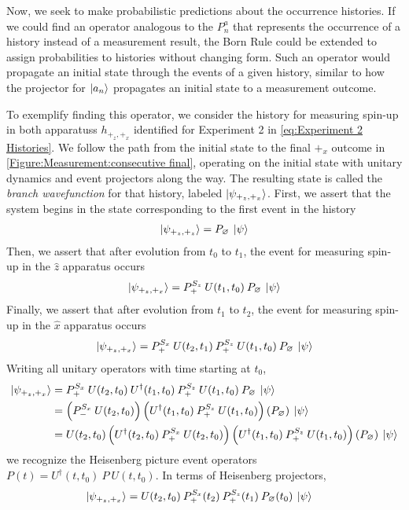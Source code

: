 Now, we seek to make probabilistic predictions about the occurrence histories. If we could find an operator analogous to the $P^a_n$ that represents the occurrence of a history instead of a measurement result, the Born Rule could be extended to assign probabilities to histories without changing form. Such an operator would propagate an initial state through the events of a given history, similar to how the projector for $\ket{a_n}$ propagates an initial state to a measurement outcome.

To exemplify finding this operator, we consider the history for measuring spin-up in both apparatuss $h_{+_z, +_x}$ identified for Experiment 2 in \autoref{eq:Experiment 2 Histories}. We follow the path from the initial state to the final $+_x$ outcome in \autoref{Figure:Measurement:consecutive final}, operating on the initial state with unitary dynamics and event projectors along the way. The resulting state is called the \textit{branch wavefunction} for that history, labeled $\ket{\psi_{+_z, +_x}}$.  First, we assert that the system begins in the state corresponding to the first event in the history
\begin{align}
  \ket{\psi_{+_z, +_z}} = P_\varnothing \: \ket{\psi}
\end{align}
Then, we assert that after evolution from $t_0$ to $t_1$, the event for measuring spin-up in the $\hat{z}$ apparatus occurs
\begin{align}
  \ket{\psi_{+_z, +_x}} = P^{S_z}_+ \: U(t_1, t_0) \: P_\varnothing \: \ket{\psi}
\end{align}
Finally, we assert that after evolution from $t_1$ to $t_2$, the event for measuring spin-up in the $\hat{x}$ apparatus occurs
\begin{align}
  \ket{\psi_{+_z, +_x}} = P^{S_x}_+ \: U(t_2, t_1) \: P^{S_z}_+ \: U(t_1, t_0) \: P_\varnothing \: \ket{\psi}
\end{align}
Writing all unitary operators with time starting at $t_0$,
\begin{align}
  \ket{\psi_{+_z, +_x}} &= P^{S_x}_+ \: U(t_2, t_0) \: U^\dagger(t_1, t_0) \: P^{S_z}_+ \: U(t_1, t_0) \: P_\varnothing \: \ket{\psi} \\ \nonumber
  &= \left(P^{S_x}_- \: U(t_2, t_0) \right) \left( U^\dagger(t_1, t_0) \: P^{S_z}_+ \: U(t_1, t_0) \right) \left( P_\varnothing \right) \: \ket{\psi} \\ \nonumber
  &= U(t_2, t_0)\left(U^\dagger(t_2, t_0) \: P^{S_x}_+ \: U(t_2, t_0) \right) \left( U^\dagger(t_1, t_0) \: P^{S_z}_+ \: U(t_1, t_0) \right) \left( P_\varnothing \right) \: \ket{\psi}
\end{align}
we recognize the Heisenberg picture event operators ${P}(t) = U^\dagger(t, t_0) \: P \: U(t, t_0)$. In terms of Heisenberg projectors,
\begin{align} \label{eq:branch wavefunction}
  \ket{\psi_{+_z, +_x}} &= U(t_2, t_0) \: {P^{S_x}_+(t_2)} \: {P^{S_z}_+(t_1)} \: {P_\varnothing(t_0)} \: \ket{\psi}
\end{align}

